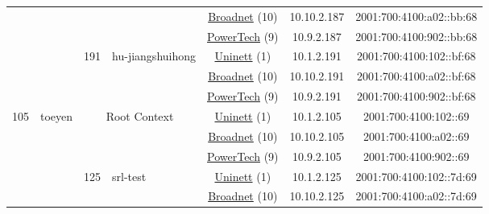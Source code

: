 \begin{small}
\begin{center}
\begin{longtable}{|c|c|c|c|c|c|c|c|}
  &  &  &  & \multicolumn{2}{|c|}{\tiny{\href{https://www.broadnet.no}{Broadnet} (10)}} & \tiny{10.10.2.187} & \tiny{2001:700:4100:a02::bb:68} \\* \cline{5-5}\cline{6-6}\cline{7-7}\cline{8-8}
  &  &  &  & \multicolumn{2}{|c|}{\tiny{\href{http://www.powertech.no}{PowerTech} (9)}} & \tiny{10.9.2.187} & \tiny{2001:700:4100:902::bb:68} \\* \cline{3-3}\cline{4-4}\cline{5-5}\cline{6-6}\cline{7-7}\cline{8-8}
  &  & \multirow{3}{*}{\tiny{191}} & \multicolumn{1}{|l|}{\multirow{3}{*}{\tiny{hu-jiangshuihong}}} & \multicolumn{2}{|c|}{\tiny{\href{https://www.uninett.no}{Uninett} (1)}} & \tiny{10.1.2.191} & \tiny{2001:700:4100:102::bf:68} \\* \cline{5-5}\cline{6-6}\cline{7-7}\cline{8-8}
  &  &  &  & \multicolumn{2}{|c|}{\tiny{\href{https://www.broadnet.no}{Broadnet} (10)}} & \tiny{10.10.2.191} & \tiny{2001:700:4100:a02::bf:68} \\* \cline{5-5}\cline{6-6}\cline{7-7}\cline{8-8}
  &  &  &  & \multicolumn{2}{|c|}{\tiny{\href{http://www.powertech.no}{PowerTech} (9)}} & \tiny{10.9.2.191} & \tiny{2001:700:4100:902::bf:68} \\ \hline
 \multirow{36}{*}{\tiny{105}} & \multicolumn{1}{|l|}{\multirow{36}{*}{\tiny{toeyen}}} & \multicolumn{2}{|c|}{\multirow{3}{*}{\tiny{Root Context}}} & \multicolumn{2}{|c|}{\tiny{\href{https://www.uninett.no}{Uninett} (1)}} & \tiny{10.1.2.105} & \tiny{2001:700:4100:102::69} \\* \cline{5-5}\cline{6-6}\cline{7-7}\cline{8-8}
  &  & \multicolumn{2}{|c|}{} & \multicolumn{2}{|c|}{\tiny{\href{https://www.broadnet.no}{Broadnet} (10)}} & \tiny{10.10.2.105} & \tiny{2001:700:4100:a02::69} \\* \cline{5-5}\cline{6-6}\cline{7-7}\cline{8-8}
  &  & \multicolumn{2}{|c|}{} & \multicolumn{2}{|c|}{\tiny{\href{http://www.powertech.no}{PowerTech} (9)}} & \tiny{10.9.2.105} & \tiny{2001:700:4100:902::69} \\* \cline{3-3}\cline{4-4}\cline{5-5}\cline{6-6}\cline{7-7}\cline{8-8}
  &  & \multirow{3}{*}{\tiny{125}} & \multicolumn{1}{|l|}{\multirow{3}{*}{\tiny{srl-test}}} & \multicolumn{2}{|c|}{\tiny{\href{https://www.uninett.no}{Uninett} (1)}} & \tiny{10.1.2.125} & \tiny{2001:700:4100:102::7d:69} \\* \cline{5-5}\cline{6-6}\cline{7-7}\cline{8-8}
  &  &  &  & \multicolumn{2}{|c|}{\tiny{\href{https://www.broadnet.no}{Broadnet} (10)}} & \tiny{10.10.2.125} & \tiny{2001:700:4100:a02::7d:69} \\* \cline{5-5}\cline{6-6}\cline{7-7}\cline{8-8}

\end{longtable}
\end{center}
\end{small}
